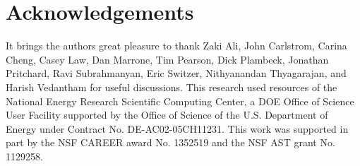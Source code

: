 \documentclass[twocolumn,apj,numberedappendix]{emulateapj}
\newcommand{\N}{\mathbf{N}}
\newcommand{\mep}[1]{}
\begin{document}
%

\section{Acknowledgements}
It brings the authors great pleasure to thank Zaki Ali, John Carlstrom, Carina Cheng, Casey Law, Dan Marrone, Tim Pearson, Dick Plambeck, Jonathan Pritchard, Ravi Subrahmanyan, Eric Switzer, Nithyanandan Thyagarajan, and Harish Vedantham for useful discussions. This research used resources of the National Energy Research
Scientific Computing Center, a DOE Office of Science User Facility 
supported by the Office of Science of the U.S. Department of Energy 
under Contract No. DE-AC02-05CH11231. This work was supported in part by the NSF CAREER award No. 1352519 and the NSF AST grant No. 1129258.
\end{document}
